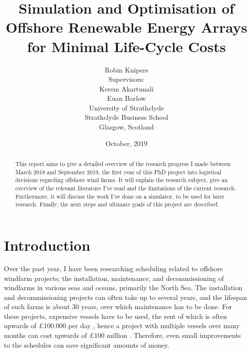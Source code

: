 \documentclass[a4paper,12pt]{article}
\begin{document}
\title{Simulation and Optimisation of Offshore Renewable Energy Arrays for Minimal Life-Cycle Costs}
\author{Robin Kuipers \\[1cm] Supervisors: \\ Kerem Akartunali \\ Euan Barlow\\[2cm] University of Strathclyde \\ Strathclyde Business School \\ {\small Glasgow, Scotland}}
\date{October, 2019}

\maketitle

\pagebreak

\begin{abstract}
This report aims to give a detailed overview of the research progress I made between March 2018 and September 2019, the first year of this PhD project into logistical decisions regarding offshore wind farms. It will explain the research subject, give an overview of the relevant literature I've read and the limitations of the current research. Furthermore, it will discuss the work I've done on a simulator, to be used for later research. Finally, the next steps and ultimate goals of this project are described. 
\end{abstract}

\pagebreak

\tableofcontents

\pagebreak

\section{Introduction} \label{s:intro}
Over the past year, I have been researching scheduling related to offshore windfarm projects; the installation, maintenance, and decommissioning of windfarms in various seas and oceans, primarily the North Sea. The installation and decommissioning projects can often take up to several years, and the lifespan of such farms is about 30 years, over which maintenance has to be done. For these projects, expensive vessels have to be used, the rent of which is often upwards of \pounds 100.000 per day \cite{barlow2014support}, hence a project with multiple vessels over many months can cost upwards of \pounds 100 million \cite{kaiser2010offshore}. Therefore, even small improvements to the schedules can save significant amounts of money.
\end{document}
